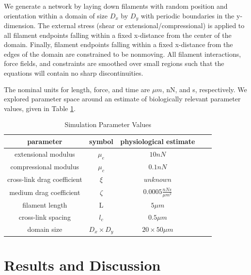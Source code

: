 \documentclass[10pt,letterpaper]{article}
\begin{document}
We generate a network by laying down filaments with random position and orientation within a domain of size $D_x$ by $D_y$ with periodic boundaries in the y-dimension.  The external stress (shear or extensional/compressional) is applied to all filament endpoints falling within a fixed x-distance from the center of the domain.  Finally, filament endpoints falling within a fixed x-distance from the edges of the domain are constrained to be nonmoving.  All filament interactions, force fields, and constraints are smoothed over small regions such that the equations will contain no sharp discontinuities.


The nominal units for length, force, and time are $\mu m$, nN, and s, respectively.  We explored parameter space around an estimate of biologically relevant parameter values, given in Table \ref{table:para}. 

\begin{table}[h]
\centering
\caption{Simulation Parameter Values}
\label{table:para}
\begin{tabular}{|c|c|c|c|c|}
\hline
{\bf parameter}             & {\bf symbol} & {\bf physiological estimate}          \\ \hline
extensional modulus         & $\mu_e$        & $10 nN $                                               \\
compressional modulus             & $\mu_c$     & $ 0.1 nN $                           \\
cross-link drag coefficient & $\xi$      & $unknown $              \\
medium drag coefficient     & $\zeta$        & $0.0005 \frac{nN s}{\mu m^2} $      \\
filament length             & L            & $5 \mu m$                                          \\
cross-link spacing          & $l_c$        & $0.5 \mu m$                                         \\
domain size                 & $D_x\times D_y$            & $20\times 50 \mu m$                                 \\ \hline
\end{tabular}
\end{table}



\section*{Results and Discussion}
\end{document}
